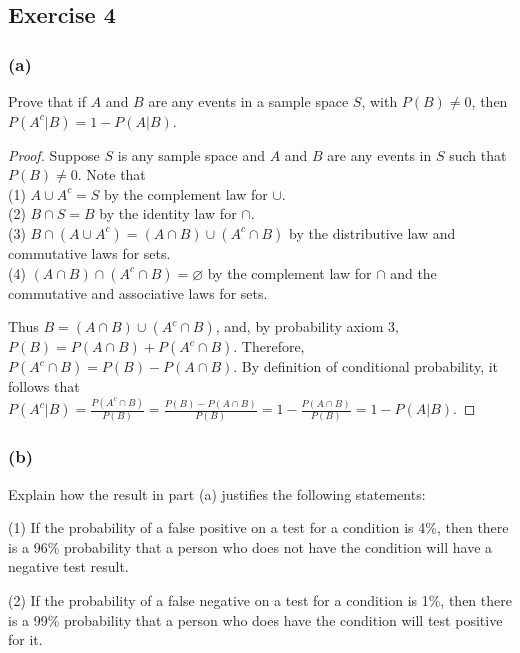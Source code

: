 \documentclass[14pt]{extarticle}
\newcommand{\es}{\varnothing}
\begin{document}
\subsection{Exercise 4}
\subsubsection{(a)}
Prove that if \(A\) and \(B\) are any events in a sample space \(S\), with \(P(B) \neq 0\), then \(P(A^c | B) = 1 - P(A|B)\).

\begin{proof}
Suppose \(S\) is any sample space and \(A\) and \(B\) are any events in \(S\) such that \(P(B) \neq 0\). Note that \\
(1) \(A \cup A^c = S\) by the complement law for \(\cup\). \\
(2) \(B \cap S = B\) by the identity law for \(\cap\). \\
(3) \(B \cap (A \cup A^c) = (A \cap B) \cup (A^c \cap B)\) by the distributive law and commutative laws for sets. \\
(4) \((A \cap B) \cap (A^c \cap B) = \es\) by the complement law for \(\cap\) and the commutative and associative laws for 
sets.

Thus \(B = (A \cap B) \cup (A^c \cap B)\), and, by probability axiom 3, \(P(B) = P (A \cap B) + P (A^c \cap B)\). Therefore, 
\(P(A^c \cap B) = P(B) - P(A \cap B)\). By definition of conditional probability, it follows that \(P(A^c | B) = 
\frac{P(A^c \cap B)}{P(B)} = \frac{P(B) - P(A \cap B)}{P(B)} = 1 - \frac{P(A \cap B)}{P(B)} = 1 - P(A | B)\).
\end{proof}

\subsubsection{(b)}
Explain how the result in part (a) justifies the following statements: 

(1) If the probability of a false positive on a test for a condition is 4\%, then there is a 96\% probability that a 
person who does not have the condition will have a negative test result. 

(2) If the probability of a false negative on a test for a condition is 1\%, then there is a 99\% probability that a 
person who does have the condition will test positive for it.
\end{document}
